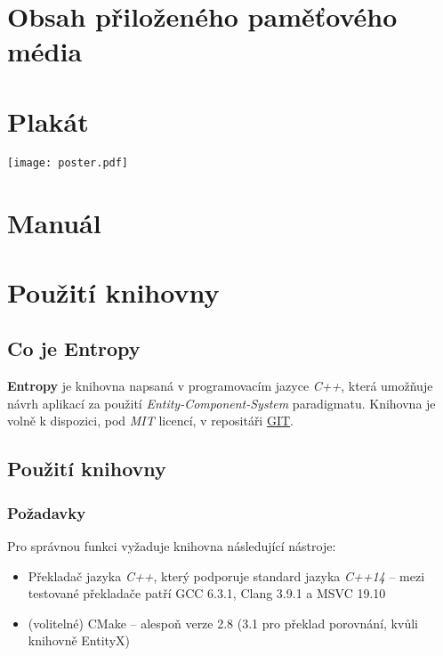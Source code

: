 
\chapter{Obsah přiloženého paměťového média}

\chapter{Plakát}
\begin{center}
	\texttt{[image: poster.pdf]}
\end{center}

\chapter{Manuál}

\chapter{Použití knihovny}

\section*{Co je Entropy}

\textbf{Entropy} je knihovna napsaná v programovacím jazyce \emph{C++}, která umožňuje návrh aplikací za použití \emph{Entity-Component-System} paradigmatu. Knihovna je volně k dispozici, pod \emph{MIT} licencí, v repositáři \href{https://github.com/T0mt0mp/Entropy}{GIT}. 

\section*{Použití knihovny}

\subsection*{Požadavky}

Pro správnou funkci vyžaduje knihovna následující nástroje: 
\begin{itemize}
	\item Překladač jazyka \emph{C++}, který podporuje standard jazyka \emph{C++14} -- mezi testované překladače patří GCC 6.3.1, Clang 3.9.1 a MSVC 19.10
	\item (volitelné) CMake -- alespoň verze 2.8 (3.1 pro překlad porovnání, kvůli knihovně EntityX)
\end{itemize}

